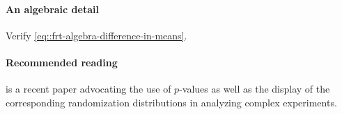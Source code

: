 \paragraph{An algebraic detail}
\label{hw::frt-algebraic-detail}

Verify \eqref{eq::frt-algebra-difference-in-means}. 



\paragraph{Recommended reading}

\citet{bind2020possible} is a recent paper advocating the use of $p$-values as well as the display of the corresponding randomization distributions in analyzing complex experiments. 


